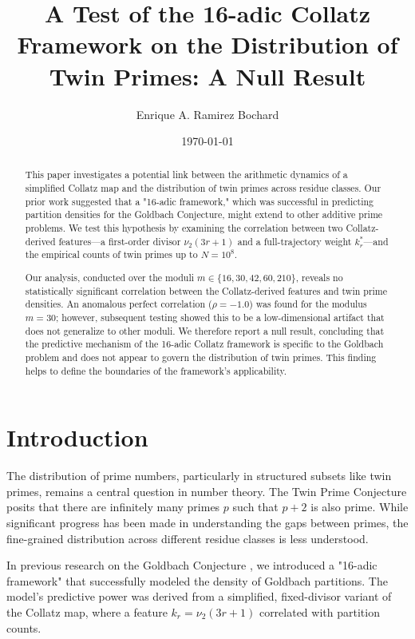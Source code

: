 \documentclass[12pt]{article}
\title{A Test of the 16-adic Collatz Framework on the Distribution of Twin Primes: A Null Result}
\author{Enrique A. Ramirez Bochard}
\date{\today}
\begin{document}
	\maketitle
	
	\begin{abstract}
		This paper investigates a potential link between the arithmetic dynamics of a simplified Collatz map and the distribution of twin primes across residue classes. Our prior work suggested that a "16-adic framework," which was successful in predicting partition densities for the Goldbach Conjecture, might extend to other additive prime problems. We test this hypothesis by examining the correlation between two Collatz-derived features---a first-order divisor $\nu_2(3r+1)$ and a full-trajectory weight $k_r^*$---and the empirical counts of twin primes up to $N = 10^8$. 
		
		Our analysis, conducted over the moduli $m \in \{16, 30, 42, 60, 210\}$, reveals no statistically significant correlation between the Collatz-derived features and twin prime densities. An anomalous perfect correlation ($ \rho = -1.0 $) was found for the modulus $m=30$; however, subsequent testing showed this to be a low-dimensional artifact that does not generalize to other moduli. We therefore report a null result, concluding that the predictive mechanism of the 16-adic Collatz framework is specific to the Goldbach problem and does not appear to govern the distribution of twin primes. This finding helps to define the boundaries of the framework's applicability.
	\end{abstract}
	
	\section{Introduction}
	The distribution of prime numbers, particularly in structured subsets like twin primes, remains a central question in number theory. The Twin Prime Conjecture posits that there are infinitely many primes $p$ such that $p+2$ is also prime. While significant progress has been made in understanding the gaps between primes, the fine-grained distribution across different residue classes is less understood.
	
	In previous research on the Goldbach Conjecture \cite{goldbach_paper}, we introduced a "16-adic framework" that successfully modeled the density of Goldbach partitions. The model's predictive power was derived from a simplified, fixed-divisor variant of the Collatz map, where a feature $k_r = \nu_2(3r+1)$ correlated with partition counts.
	
\end{document}
